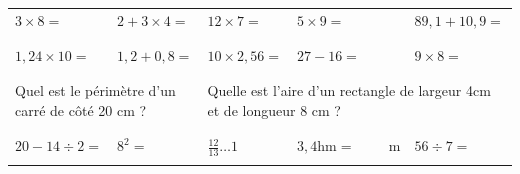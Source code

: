 \documentclass[14]{article}
\begin{document}
    \begin{tabular}{p{3cm}|p{3cm}|p{3cm}|p{3cm}|p{3cm}}
         $3\times8=$ & $2+3\times4=$ & $12\times 7 = $ & $5\times9=$ & $89,1+10,9=$\\ 
         
         & & & &\\ \hline & & & &\\
         
         $1,24\times 10=$ & $1,2+0,8=$ & $10\times2,56=$ &  $27-16=$ & $9\times8=$\\
         
         & & & &\\ \hline \multicolumn{2}{c|}{} & \multicolumn{2}{c}{}\\
         
         \multicolumn{2}{l|}{Quel est le périmètre d'un carré de côté 20 cm ?} & 
         \multicolumn{3}{l}{Quelle est l'aire d'un rectangle de largeur 4cm et de longueur 8 cm ?}\\
         
        \multicolumn{2}{c|}{} & \multicolumn{2}{c}{} \\ \hline & & & &\\

        $20-14\div2=$ & $8^2=$ & $\frac{12}{13} \ldots 1$ & $3,4 \text{hm} = \hspace{1cm} \text{m}$ & $56\div7=$ \\

        & & & &\\ 
    \end{tabular}

\bigskip

\enteteActivite{\monTitre}{\theserie}
\end{document}
